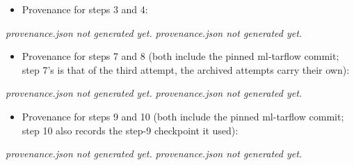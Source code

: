 \documentclass[11pt]{article}
\begin{document}
\begin{itemize}
  \item Provenance for steps 3 and 4:
\end{itemize}
{\scriptsize
{}
  {}
  {\emph{provenance.json not generated yet.}}
  {}
  {\emph{provenance.json not generated yet.}}}

\begin{itemize}
  \item Provenance for steps 7 and 8 (both include the pinned ml-tarflow
        commit; step 7's is that of the third attempt, the archived attempts
        carry their own):
\end{itemize}
{\scriptsize
{}
  {}
  {\emph{provenance.json not generated yet.}}
  {}
  {\emph{provenance.json not generated yet.}}}

\begin{itemize}
  \item Provenance for steps 9 and 10 (both include the pinned ml-tarflow
        commit; step 10 also records the step-9 checkpoint it used):
\end{itemize}
{\scriptsize
{}
  {}
  {\emph{provenance.json not generated yet.}}
  {}
  {\emph{provenance.json not generated yet.}}}
\end{document}

